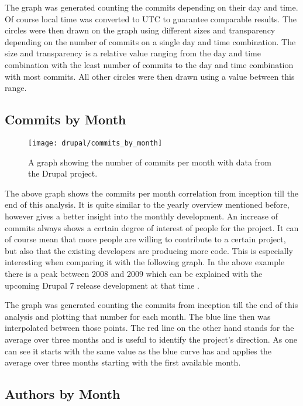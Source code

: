 The graph was generated counting the commits depending on their day and time.
Of course local time was converted to \ac{UTC} to guarantee comparable results.
The circles were then drawn on the graph using different sizes and transparency
depending on the number of commits on a single day and time combination. The
size and transparency is a relative value ranging from the day and time
combination with the least number of commits to the day and time combination
with most commits. All other circles were then drawn using a value between this
range.


\subsection{Commits by Month} %

\begin{figure}[h!t]
  \centering
  \texttt{[image: drupal/commits\_by\_month]}
  \caption{A graph showing the number of commits per month with data from the
  Drupal project.}
\end{figure}

The above graph shows the commits per month correlation from inception till the
end of this analysis. It is quite similar to the yearly overview mentioned
before, however gives a better insight into the monthly development. An
increase of commits always shows a certain degree of interest of people for the
project. It can of course mean that more people are willing to contribute to a
certain project, but also that the existing developers are producing more code.
This is especially interesting when comparing it with the following graph. In
the above example there is a peak between 2008 and 2009 which can be explained
with the upcoming Drupal 7 release development at that time .

The graph was generated counting the commits from inception till the end of
this analysis and plotting that number for each month. The blue line then was
interpolated between those points. The red line on the other hand stands for
the average over three months and is useful to identify the project's
direction. As one can see it starts with the same value as the blue curve has
and applies the average over three months starting with the first available
month.


\subsection{Authors by Month} %

